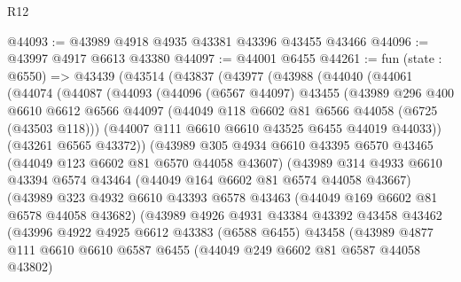 \begin{lexlean}{R12}
\begin{coremodule}
@44093 := @43989 @4918 @4935 @43381 @43396 @43455 @43466
@44096 := @43997 @4917 @6613 @43380
@44097 := @44001 @6455
@44261 := fun (state : @6550) =>
  @43439
    (@43514
      (@43837
        (@43977
          (@43988
            (@44040
              (@44061
                (@44074
                  (@44087
                    (@44093
                      (@44096
                        (@6567 @44097)
                        @43455
                        (@43989
                          @296
                          @400
                          @6610
                          @6612
                          @6566
                          @44097
                          (@44049 @118 @6602 @81 @6566 @44058 (@6725 (@43503 @118)))
                          (@44007 @111 @6610 @6610 @43525 @6455 @44019 @44033))
                        (@43261 @6565 @43372))
                      (@43989
                        @305
                        @4934
                        @6610
                        @43395
                        @6570
                        @43465
                        (@44049 @123 @6602 @81 @6570 @44058 @43607)
                        (@43989
                          @314
                          @4933
                          @6610
                          @43394
                          @6574
                          @43464
                          (@44049 @164 @6602 @81 @6574 @44058 @43667)
                          (@43989
                            @323
                            @4932
                            @6610
                            @43393
                            @6578
                            @43463
                            (@44049 @169 @6602 @81 @6578 @44058 @43682)
                            (@43989
                              @4926
                              @4931
                              @43384
                              @43392
                              @43458
                              @43462
                              (@43996
                                @4922
                                @4925
                                @6612
                                @43383
                                (@6588 @6455)
                                @43458
                                (@43989
                                  @4877
                                  @111
                                  @6610
                                  @6610
                                  @6587
                                  @6455
                                  (@44049 @249 @6602 @81 @6587 @44058 @43802)

\end{coremodule}
\end{lexlean}
